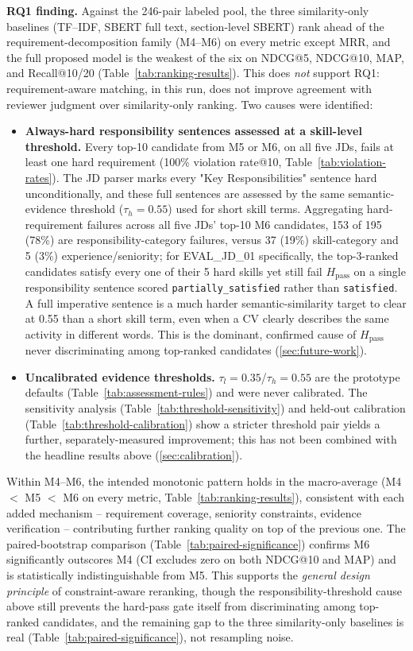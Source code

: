 \documentclass[12pt,a4paper,oneside]{report}
\begin{document}
\textbf{RQ1 finding.} Against the 246-pair labeled pool, the three similarity-only baselines (TF--IDF, SBERT full text, section-level SBERT) rank ahead of the requirement-decomposition family (M4--M6) on every metric except MRR, and the full proposed model is the weakest of the six on NDCG@5, NDCG@10, MAP, and Recall@10/20 (Table~\ref{tab:ranking-results}). This does \emph{not} support RQ1: requirement-aware matching, in this run, does not improve agreement with reviewer judgment over similarity-only ranking. Two causes were identified:
\begin{itemize}
  \item \textbf{Always-hard responsibility sentences assessed at a skill-level threshold.} Every top-10 candidate from M5 or M6, on all five JDs, fails at least one hard requirement (100\% violation rate@10, Table~\ref{tab:violation-rates}). The JD parser marks every "Key Responsibilities" sentence hard unconditionally, and these full sentences are assessed by the same semantic-evidence threshold ($\tau_h{=}0.55$) used for short skill terms. Aggregating hard-requirement failures across all five JDs' top-10 M6 candidates, 153 of 195 (78\%) are responsibility-category failures, versus 37 (19\%) skill-category and 5 (3\%) experience/seniority; for EVAL\_JD\_01 specifically, the top-3-ranked candidates satisfy every one of their 5 hard skills yet still fail $H_{\mathrm{pass}}$ on a single responsibility sentence scored \texttt{partially\_satisfied} rather than \texttt{satisfied}. A full imperative sentence is a much harder semantic-similarity target to clear at 0.55 than a short skill term, even when a CV clearly describes the same activity in different words. This is the dominant, confirmed cause of $H_{\mathrm{pass}}$ never discriminating among top-ranked candidates (\cref{sec:future-work}).
  \item \textbf{Uncalibrated evidence thresholds.} $\tau_l=0.35$/$\tau_h=0.55$ are the prototype defaults (Table~\ref{tab:assessment-rules}) and were never calibrated. The sensitivity analysis (Table~\ref{tab:threshold-sensitivity}) and held-out calibration (Table~\ref{tab:threshold-calibration}) show a stricter threshold pair yields a further, separately-measured improvement; this has not been combined with the headline results above (\cref{sec:calibration}).
\end{itemize}
Within M4--M6, the intended monotonic pattern holds in the macro-average (M4 $<$ M5 $<$ M6 on every metric, Table~\ref{tab:ranking-results}), consistent with each added mechanism -- requirement coverage, seniority constraints, evidence verification -- contributing further ranking quality on top of the previous one. The paired-bootstrap comparison (Table~\ref{tab:paired-significance}) confirms M6 significantly outscores M4 (CI excludes zero on both NDCG@10 and MAP) and is statistically indistinguishable from M5. This supports the \emph{general design principle} of constraint-aware reranking, though the responsibility-threshold cause above still prevents the hard-pass gate itself from discriminating among top-ranked candidates, and the remaining gap to the three similarity-only baselines is real (Table~\ref{tab:paired-significance}), not resampling noise.
\end{document}
